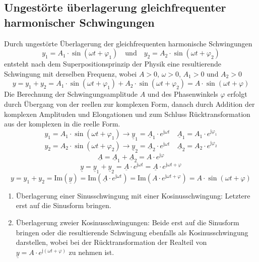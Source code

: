 \subsection{Ungestörte überlagerung gleichfrequenter harmonischer Schwingungen}
Durch ungestörte Überlagerung der gleichfrequenten harmonische Schwingungen
\begin{equation}
\boxed{y_1=A_1\cdot \sin\left(\omega t+\varphi_1\right)\quad \text{und}\quad y_2=A_2\cdot \sin\left(\omega t+\varphi_2\right)}
\end{equation}
entsteht nach dem Superpositionsprinzip der Physik eine resultierende Schwingung mit derselben Frequenz, wobei $A>0$, $\omega>0$, $A_1>0$ und $A_2>0$
\begin{equation}
\boxed{y=y_1+y_2=A_1\cdot \sin\left(\omega t+\varphi_1\right)+A_2\cdot \sin\left(\omega t+\varphi_2\right)=A\cdot \sin\left(\omega t+\varphi\right)}
\end{equation}
Die Berechnung der Schwingungsamplitude $A$ und des Phasenwinkels $\varphi$ erfolgt durch Übergang von der reellen zur komplexen Form, danach durch Addition der komplexen Amplituden und Elongationen und zum Schluss Rücktransformation aus der komplexen in die reelle Form.
\begin{equation}
\boxed{y_1=A_1\cdot \sin\left(\omega t + \varphi_1\right)\rightarrow \underline{y}_1=\underline{A}_1\cdot e^{\text{j}\omega t}}\quad \boxed{\underline{A}_1=A_1\cdot e^{\text{j}\varphi_1}}
\end{equation}
\begin{equation}
\boxed{y_2=A_2\cdot \sin\left(\omega t + \varphi_2\right)\rightarrow \underline{y}_2=\underline{A}_2\cdot e^{\text{j}\omega t}}\quad \boxed{\underline{A}_2=A_2\cdot e^{\text{j}\varphi_2}}
\end{equation}
\begin{equation}
\boxed{\underline{A}=\underline{A}_1+\underline{A}_2=A\cdot e^{\text{j}\varphi}}
\end{equation}
\begin{equation}
\boxed{\underline{y}=\underline{y}_1+\underline{y}_2=\underline{A}\cdot e^{\text{j}\omega t}=\underline{A}\cdot e^{\text{j}\omega t+\varphi}}
\end{equation}
\begin{equation}
\boxed{y=y_1+y_2=\text{Im}\left(\underline{y}\right)=\text{Im}\left(\underline{A}\cdot e^{\text{j}\omega t}\right)=\text{Im}\left(A\cdot e^{\text{j}\omega t+\varphi}\right)=A\cdot \sin\left(\omega t+\varphi\right)}
\end{equation}
\begin{enumerate}[$(i)$]
\item Überlagerung einer Sinusschwingung mit einer Kosinusschwingung: Letztere erst auf die Sinusform bringen.
\item Überlagerung zweier Kosinusschwingungen: Beide erst auf die Sinusform bringen oder die resultierende Schwingung ebenfalls als Kosinusschwingung darstellen, wobei bei der Rücktransformation der Realteil von $\underline{y}=A\cdot e^{\text{j}\left(\omega t + \varphi\right)}$ zu nehmen ist.
\end{enumerate}
